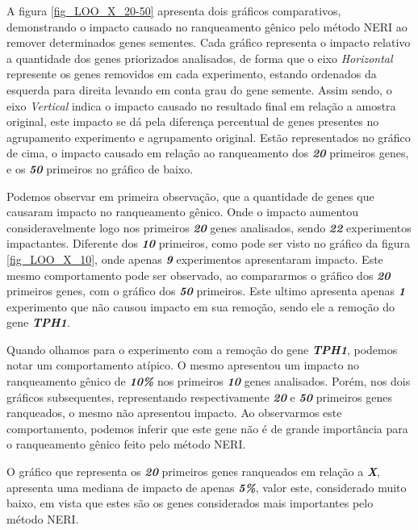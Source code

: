 %
A figura \ref{fig_LOO_X_20-50} apresenta dois gráficos comparativos, demonstrando o impacto causado no ranqueamento gênico pelo método NERI ao remover determinados genes sementes. Cada gráfico representa o impacto relativo a quantidade dos genes priorizados analisados, de forma que o eixo \textsl{Horizontal} represente os genes removidos em cada experimento, estando ordenados da esquerda para direita levando em conta grau do gene semente. Assim sendo, o eixo \textsl{Vertical} indica o impacto causado no resultado final em relação a amostra original, este impacto se dá pela diferença percentual de genes presentes no agrupamento experimento e agrupamento original. Estão representados no gráfico de cima, o impacto causado em relação ao ranqueamento dos \textsl{\textbf{20}} primeiros genes, e os \textsl{\textbf{50}} primeiros no gráfico de baixo.

%
Podemos observar em primeira observação, que a quantidade de genes que causaram impacto no ranqueamento gênico. Onde o impacto aumentou consideravelmente logo nos primeiros \textsl{\textbf{20}} genes analisados, sendo \textsl{\textbf{22}} experimentos impactantes. Diferente dos \textsl{\textbf{10}} primeiros, como pode ser visto no gráfico da figura \ref{fig_LOO_X_10}, onde apenas \textsl{\textbf{9}} experimentos apresentaram impacto. Este mesmo comportamento pode ser observado, ao compararmos o gráfico dos \textsl{\textbf{20}} primeiros genes, com o gráfico dos \textsl{\textbf{50}} primeiros. Este ultimo apresenta apenas \textsl{\textbf{1}} experimento que não causou impacto em sua remoção, sendo ele a remoção do gene \textsl{\textbf{TPH1}}.

%
Quando olhamos para o experimento com a remoção do gene \textsl{\textbf{TPH1}}, podemos notar um comportamento atípico. O mesmo apresentou um impacto no ranqueamento gênico de \textsl{\textbf{10\%}} nos primeiros \textsl{\textbf{10}} genes analisados. Porém, nos dois gráficos subsequentes, representando respectivamente \textsl{\textbf{20}} e \textsl{\textbf{50}} primeiros genes ranqueados, o mesmo não apresentou impacto. Ao observarmos este comportamento, podemos inferir que este gene não é de grande importância para o ranqueamento gênico feito pelo método NERI.

%
O gráfico que representa os \textsl{\textbf{20}} primeiros genes ranqueados em relação a \textsl{\textbf{X}}, apresenta uma mediana de impacto de apenas \textsl{\textbf{5\%}}, valor este, considerado muito baixo, em vista que estes são os genes considerados mais importantes pelo método NERI.

